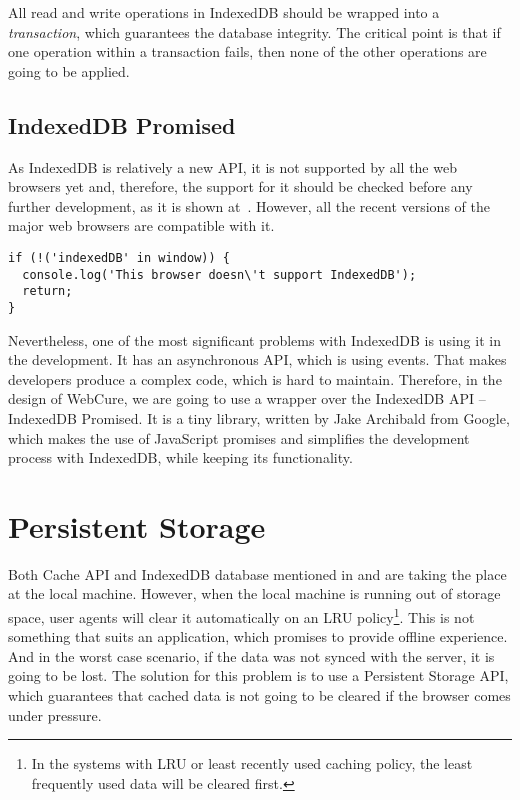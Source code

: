 All read and write operations in IndexedDB should be wrapped into a \textit{transaction}, which guarantees the database integrity. The critical point is that if one operation within a transaction fails, then none of the other operations are going to be applied. 

\subsection{IndexedDB Promised}

As IndexedDB is relatively a new API, it is not supported by all the web browsers yet and, therefore, the support for it should be checked before any further development, as it is shown at~. However, all the recent versions of the major web browsers are compatible with it. 

\begin{lstlisting}[caption={An example code, which demonstrates how one can check the support for IndexedDB API\cite{35}.}, label={lst:tech7}]
if (!('indexedDB' in window)) {
  console.log('This browser doesn\'t support IndexedDB');
  return;
}
\end{lstlisting}

Nevertheless, one of the most significant problems with IndexedDB is using it in the development. It has an asynchronous API, which is using events. That makes developers produce a complex code, which is hard to maintain. Therefore, in the design of WebCure, we are going to use a wrapper over the IndexedDB API -- IndexedDB Promised\cite{36, 48}. It is a tiny library, written by Jake Archibald from Google, which makes the use of JavaScript promises and simplifies the development process with IndexedDB, while keeping its functionality.

\section{Persistent Storage}
\label{persistentstorage}

Both Cache API and IndexedDB database mentioned in  and  are taking the place at the local machine. However, when the local machine is running out of storage space, user agents will clear it automatically on an LRU policy\footnote{In the systems with LRU or least recently used caching policy, the least frequently used data will be cleared first.}\cite{47}. This is not something that suits an application, which promises to provide offline experience. And in the worst case scenario, if the data was not synced with the server, it is going to be lost. The solution for this problem is to use a Persistent Storage API\cite{45, 46}, which guarantees that cached data is not going to be cleared if the browser comes under pressure.

